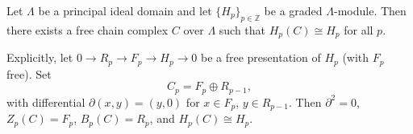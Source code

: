 Let $\Lambda$ be a principal ideal domain and let $\{H_p\}_{p \in \mathbb{Z}}$ be a graded $\Lambda$-module. Then there exists a free chain complex $C$ over $\Lambda$ such that $H_p(C) \cong H_p$ for all $p$.

Explicitly, let $0 \rightarrow R_p \rightarrow F_p \rightarrow H_p \rightarrow 0$ be a free presentation of $H_p$ (with $F_p$ free). Set
$$C_p = F_p \oplus R_{p-1},$$
with differential $\partial(x, y) = (y, 0)$ for $x \in F_p$, $y \in R_{p-1}$. Then $\partial^2 = 0$, $Z_p(C) = F_p$, $B_p(C) = R_p$, and $H_p(C) \cong H_p$.
